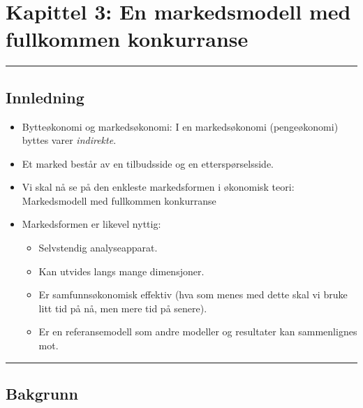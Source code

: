 \documentclass[
  letterpaper,
  DIV=11,
  numbers=noendperiod]{scrartcl}
\providecommand{\tightlist}{%
  \setlength{\itemsep}{0pt}\setlength{\parskip}{0pt}}\usepackage{longtable,booktabs,array}
\begin{document}
\section{Kapittel 3: En markedsmodell med fullkommen
konkurranse}\label{kapittel-3-en-markedsmodell-med-fullkommen-konkurranse}

\begin{center}\rule{0.5\linewidth}{0.5pt}\end{center}

\subsection{Innledning}\label{innledning}

\begin{itemize}
\tightlist
\item
  Bytteøkonomi og markedsøkonomi: I en markedsøkonomi (pengeøkonomi)
  byttes varer \emph{indirekte}.
\item
  Et marked består av en tilbudsside og en etterspørselsside.
\item
  Vi skal nå se på den enkleste markedsformen i økonomisk teori:
  Markedsmodell med fullkommen konkurranse
\item
  Markedsformen er likevel nyttig:

  \begin{itemize}
  \tightlist
  \item
    Selvstendig analyseapparat.
  \item
    Kan utvides langs mange dimensjoner.
  \item
    Er samfunnsøkonomisk effektiv (hva som menes med dette skal vi bruke
    litt tid på nå, men mere tid på senere).
  \item
    Er en referansemodell som andre modeller og resultater kan
    sammenlignes mot.
  \end{itemize}
\end{itemize}

\begin{center}\rule{0.5\linewidth}{0.5pt}\end{center}

\subsection{Bakgrunn}\label{bakgrunn}
\end{document}
